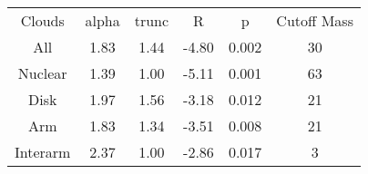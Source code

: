 \begin{table}
\begin{tabular}{cccccc}
Clouds & alpha & trunc & R & p & Cutoff Mass \\
All & 1.83 & 1.44 & -4.80 & 0.002 & 30 \\
Nuclear & 1.39 & 1.00 & -5.11 & 0.001 & 63 \\
Disk & 1.97 & 1.56 & -3.18 & 0.012 & 21 \\
Arm & 1.83 & 1.34 & -3.51 & 0.008 & 21 \\
Interarm & 2.37 & 1.00 & -2.86 & 0.017 & 3 \\
\end{tabular}
\end{table}
